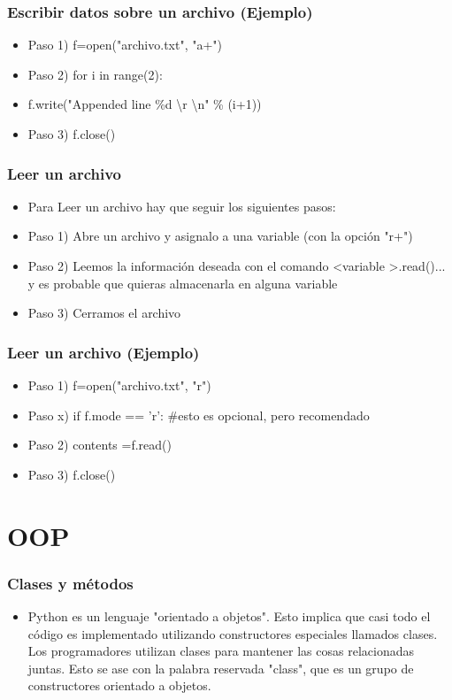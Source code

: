 \documentclass[hyperref={pdfpagelabels=false},xcolor=pst,pdf,fragile]{beamer}
\begin{document}
\begin{frame}
    \frametitle{Escribir datos sobre un archivo (Ejemplo)}
    \pause
    \begin{itemize}
    \item Paso 1) f=open("archivo.txt", "a+")
    \item Paso 2) for i in range(2):
    \item \quad \quad \quad f.write("Appended line \%d \textbackslash r \textbackslash n" \% (i+1))
    \item Paso 3) f.close()
    \end{itemize}
\end{frame}

\begin{frame}
    \frametitle{Leer un archivo}
    \pause
    \begin{itemize}
    \item Para Leer un archivo hay que seguir los siguientes pasos:
    \item Paso 1) Abre un archivo y asignalo a una variable (con la opción "r+")
    \item Paso 2) Leemos la información deseada con el comando \textless variable \textgreater .read()... y es probable que quieras almacenarla en alguna variable
    \item Paso 3) Cerramos el archivo
    \end{itemize}
\end{frame}

\begin{frame}
    \frametitle{Leer un archivo (Ejemplo)}
    \pause
    \begin{itemize}
    \item Paso 1) f=open("archivo.txt", "r")
    \item Paso x) if f.mode == 'r': \#esto es opcional, pero recomendado
    \item Paso 2) contents =f.read()
    \item Paso 3) f.close()
    \end{itemize}
\end{frame}



\section{OOP}
\begin{frame}
    \frametitle{Clases y métodos}
    \pause
    \begin{itemize}
    \item Python es un lenguaje "orientado a objetos". Esto implica que casi todo el código es implementado utilizando constructores especiales llamados clases. Los programadores utilizan clases para mantener las cosas relacionadas juntas. Esto se ase con la palabra reservada "class", que es un grupo de constructores orientado a objetos.
    \end{itemize}
\end{frame}
\end{document}
